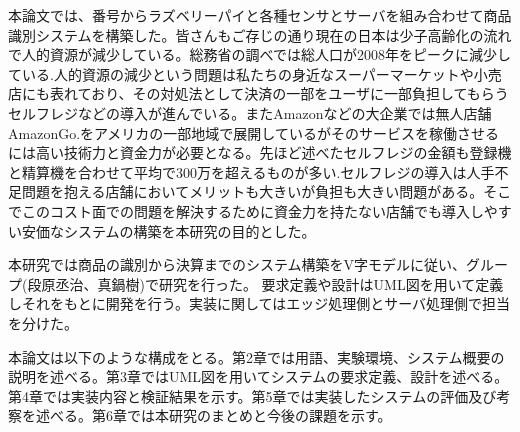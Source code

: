 本論文では、番号からラズベリーパイと各種センサとサーバを組み合わせて商品識別システムを構築した。皆さんもご存じの通り現在の日本は少子高齢化の流れで人的資源が減少している。総務省の調べでは総人口が2008年をピークに減少している\cite{population}.人的資源の減少という問題は私たちの身近なスーパーマーケットや小売店にも表れており、その対処法として決済の一部をユーザに一部負担してもらうセルフレジなどの導入が進んでいる。またAmazonなどの大企業では無人店舗AmazonGo\cite{amazongo}.をアメリカの一部地域で展開しているがそのサービスを稼働させるには高い技術力と資金力が必要となる。先ほど述べたセルフレジの金額も登録機と精算機を合わせて平均で300万を超えるものが多い\cite{self_register}.セルフレジの導入は人手不足問題を抱える店舗においてメリットも大きいが負担も大きい問題がある。そこでこのコスト面での問題を解決するために資金力を持たない店舗でも導入しやすい安価なシステムの構築を本研究の目的とした。

本研究では商品の識別から決算までのシステム構築をV字モデルに従い、グループ(段原丞治、真鍋樹)で研究を行った。
要求定義や設計はUML図を用いて定義しそれをもとに開発を行う。実装に関してはエッジ処理側とサーバ処理側で担当を分けた。

本論文は以下のような構成をとる。第2章では用語、実験環境、システム概要の説明を述べる。第3章ではUML図を用いてシステムの要求定義、設計を述べる。第4章では実装内容と検証結果を示す。第5章では実装したシステムの評価及び考察を述べる。第6章では本研究のまとめと今後の課題を示す。